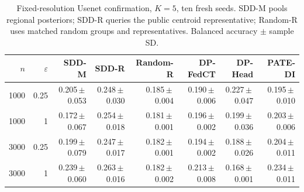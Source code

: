 \begin{table}[t]
\centering
\caption{Fixed-resolution Usenet confirmation, $K=5$, ten fresh seeds. SDD-M pools regional posteriors; SDD-R queries the public centroid representative; Random-R uses matched random groups and representatives. Balanced accuracy $\pm$ sample SD.}
\label{tab:new-confirmation}
\small\setlength{\tabcolsep}{3pt}
\begin{tabular}{@{}rrrrrrrr@{}}\toprule
$n$ & $\varepsilon$ & SDD-M & SDD-R & Random-R & DP-FedCT & DP-Head & PATE-DI \\\midrule
1000 & 0.25 & 0.205\,$\pm$\,0.053 & 0.248\,$\pm$\,0.030 & 0.185\,$\pm$\,0.004 & 0.190\,$\pm$\,0.006 & 0.227\,$\pm$\,0.047 & 0.195\,$\pm$\,0.010 \\
1000 & 1 & 0.172\,$\pm$\,0.067 & 0.254\,$\pm$\,0.018 & 0.181\,$\pm$\,0.001 & 0.196\,$\pm$\,0.002 & 0.199\,$\pm$\,0.036 & 0.203\,$\pm$\,0.006 \\
3000 & 0.25 & 0.199\,$\pm$\,0.079 & 0.247\,$\pm$\,0.017 & 0.182\,$\pm$\,0.001 & 0.194\,$\pm$\,0.002 & 0.188\,$\pm$\,0.026 & 0.204\,$\pm$\,0.011 \\
3000 & 1 & 0.239\,$\pm$\,0.060 & 0.263\,$\pm$\,0.016 & 0.182\,$\pm$\,0.002 & 0.213\,$\pm$\,0.008 & 0.168\,$\pm$\,0.001 & 0.234\,$\pm$\,0.011 \\
\bottomrule\end{tabular}
\end{table}
